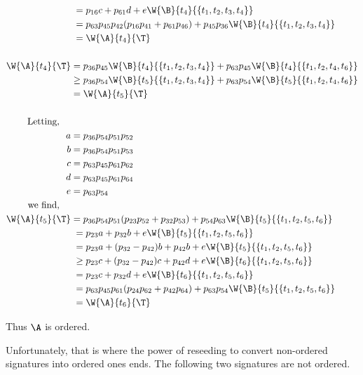 {{{\begin{align*}
            =&\;p_{16}c + p_{61}d + e\W{\B}{t_4}{\{t_1, t_2, t_3, t_4\}}\\
            =&\;p_{63}p_{45}p_{42}(p_{16}p_{41} + p_{61}p_{46}) + p_{45}p_{36}\W{\B}{t_4}{\{t_1, t_2, t_3, t_4\}}\\
            =&\; \W{\A}{t_4}{\T}\\
            \\
            \W{\A}{t_4}{\T} = \;&p_{36}p_{45}\W{\B}{t_4}{\{t_1, t_2, t_3, t_4\}} + p_{63}p_{45}\W{\B}{t_4}{\{t_1, t_2, t_4, t_6\}}\\
            \geq\;&p_{36}p_{54}\W{\B}{t_5}{\{t_1, t_2, t_3, t_4\}} + p_{63}p_{54}\W{\B}{t_5}{\{t_1, t_2, t_4, t_6\}}\\
            = \;& \W{\A}{t_5}{\T}\\
            \\
            \textrm{Letting,\quad\quad\;\;}\\
            a = \;&p_{36}p_{54}p_{51}p_{52}\\
            b = \;&p_{36}p_{54}p_{51}p_{53}\\
            c = \;&p_{63}p_{45}p_{61}p_{62}\\
            d = \;&p_{63}p_{45}p_{61}p_{64}\\
            e = \;&p_{63}p_{54}\\
            \textrm{we find,\quad\quad\;\;}\\
            \W{\A}{t_5}{\T} = \;&p_{36}p_{54}p_{51}(p_{23}p_{52} + p_{32}p_{53}) + p_{54}p_{63}\W{\B}{t_5}{\{t_1, t_2, t_5, t_6\}}\\
            =&\;p_{23}a + p_{32}b + e\W{\B}{t_5}{\{t_1, t_2, t_5, t_6\}}\\
            =&\;p_{23}a + (p_{32}-p_{42})b + p_{42}b + e\W{\B}{t_5}{\{t_1, t_2, t_5, t_6\}}\\
            \geq&\; p_{23}c + (p_{32}-p_{42})c + p_{42}d + e\W{\B}{t_6}{\{t_1, t_2, t_5, t_6\}}\\
            =&\;p_{23}c + p_{32}d + e\W{\B}{t_6}{\{t_1, t_2, t_5, t_6\}}\\
            =&\; p_{63}p_{45}p_{61}(p_{24}p_{62} + p_{42}p_{64}) + p_{63}p_{54}\W{\B}{t_5}{\{t_1, t_2, t_5, t_6\}}\\
            =&\; \W{\A}{t_6}{\T}
        \end{align*}
        }

    Thus $\A$ is ordered.
    }{}{\fried}

    Unfortunately, that is where the power of reseeding to convert non-ordered signatures into ordered ones ends. The following two signatures are not ordered.

}
